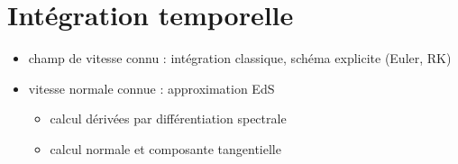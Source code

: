 


\section{Intégration temporelle}%
\begin{itemize}
	\item champ de vitesse connu : intégration classique, schéma explicite (Euler, RK)
	\item vitesse normale connue : approximation EdS
	\begin{itemize}
		\item calcul dérivées par différentiation spectrale
		\item calcul normale et composante tangentielle
	\end{itemize}
\end{itemize}


